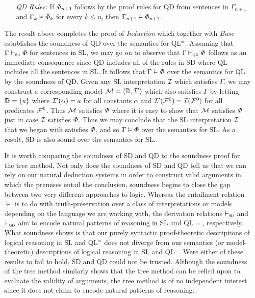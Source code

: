 \begin{enumerate}[leftmargin=1.5in]
  \item[\it QD Rules:] If $\varPhi_{n+1}$ follows by the proof rules for QD from sentences in $\Gamma_{n+1}$ and $\Gamma_k \vDash \varPhi_k$ for every $k\leq n$, then $\Gamma_{n+1} \vDash \varPhi_{n+1}$.
\end{enumerate}

The result above completes the proof of \textit{Induction} which together with \textit{Base} establishes the soundness of QD over the semantics for QL$^=$.
Assuming that $\Gamma \vdash_{\textsc{sd}}\varPhi$ for sentences in SL, we may go on to observe that $\Gamma \vdash_{\textsc{qd}}\varPhi$ follows as an immediate consequence since QD includes all of the rules in SD where QL includes all the sentences in SL. 
It follows that $\Gamma \vDash \varPhi$ over the semantics for QL$^=$ by the soundness of QD. %
Given any SL interpretation $\mathcal{I}$ which satisfies $\Gamma$, we may construct a corresponding model $\mathcal{M}=\langle\mathbb{D},\mathcal{I}'\rangle$ which also satisfies $\Gamma$ by letting $\mathbb{D}=\lbrace a\rbrace$ where $\mathcal{I}'(\alpha)=a$ for all constants $\alpha$ and $\mathcal{I}'(\mathcal{F}^0)=\mathcal{I}(\mathcal{F}^0)$ for all predicates $\mathcal{F}^0$.
Thus $\mathcal{M}$ satisfies $\varPhi$ where it is easy to show that $\mathcal{M}$ satisfies $\varPhi$ just in case $\mathcal{I}$ satisfies $\varPhi$.
Thus we may conclude that the SL interpretation $\mathcal{I}$ that we began with satisfies $\varPhi$, and so $\Gamma \vDash \varPhi$ over the semantics for SL. 
As a result, SD is also sound over the semantics for SL.

It is worth comparing the soundness of SD and QD to the soundness proof for the tree method.
Not only does the soundness of SD and QD tell us that we can rely on our natural deduction systems in order to construct valid arguments in which the premises entail the conclusion, soundness begins to close the gap between two very different approaches to logic.
Whereas the entailment relation $\models$ is to do with truth-preservation over a class of interpretations or models depending on the language we are working with, the derivation relations $\vdash_{\textsc{sd}}$ and $\vdash_{\textsc{qd}}$ aim to encode natural patterns of reasoning in SL and QL$=$, respectively. 
What soundness shows is that our purely syntactic proof-theoretic descriptions of logical reasoning in SL and QL$^=$ does not diverge from our semantics (or model-theoretic) descriptions of logical reasoning in SL and QL$^=$.
Were either of these results to fail to hold, SD and QD could not be trusted.
Although the soundness of the tree method similarly shows that the tree method can be relied upon to evaluate the validity of arguments, the tree method is of no independent interest since it does not claim to encode natural patterns of reasoning.




